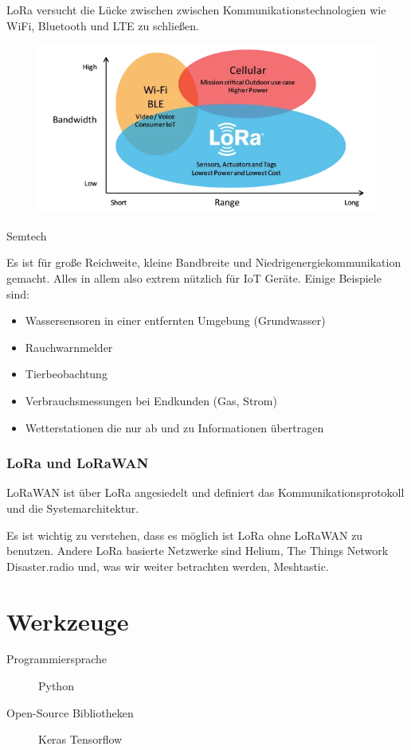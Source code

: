 \documentclass[12pt,a4paper]{article}
\begin{document}
LoRa versucht die Lücke zwischen zwischen Kommunikationstechnologien wie WiFi, Bluetooth und LTE zu schließen.\\
\begin{figure}
	\includegraphics[scale=0.7]{bandwidth-vs-range.png}
\end{figure}

Semtech

Es ist für große Reichweite, kleine Bandbreite und Niedrigenergiekommunikation gemacht. Alles in allem also extrem nützlich für IoT Geräte. Einige Beispiele sind:

\begin{itemize}
	\item Wassersensoren in einer entfernten Umgebung (Grundwasser)
	\item Rauchwarnmelder
	\item Tierbeobachtung
	\item Verbrauchsmessungen bei Endkunden (Gas, Strom)
	\item Wetterstationen die nur ab und zu Informationen übertragen
\end{itemize}

\subsubsection{LoRa und LoRaWAN}

LoRaWAN ist über LoRa angesiedelt und definiert das Kommunikationsprotokoll und die Systemarchitektur.

Es ist wichtig zu verstehen, dass es möglich ist LoRa ohne LoRaWAN zu benutzen. Andere LoRa basierte Netzwerke sind Helium, The Things Network Disaster.radio und, was wir weiter betrachten werden, Meshtastic.




\section{Werkzeuge}
\begin{description}


    \item [Programmiersprache]\tab Python
    \item [Open-Source Bibliotheken]\tab Keras \newline \tab \tab Tensorflow
 
 
\end{description}
\end{document}
